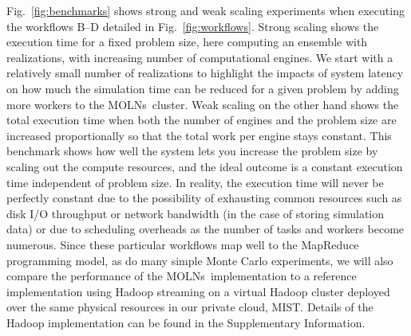 \documentclass[final,leqno,onefignum,onetabnum]{siamltex1213}
\def\packagename {MOLNs}
\begin{document}
Fig.~\ref{fig:benchmarks} shows strong and weak scaling experiments when executing the workflows B--D detailed in Fig.~\ref{fig:workflows}. Strong scaling shows the execution time for a fixed problem size, here computing an ensemble with  realizations, with increasing number of computational engines. We start with a relatively small number of realizations to highlight the impacts of system latency on how much the simulation time can be reduced for a given problem by adding more workers to the \packagename~cluster. Weak scaling on the other hand shows the total execution time when both the number of engines and the problem size are increased proportionally so that the total work per engine stays constant. This benchmark shows how well the system lets you increase the problem size by scaling out the compute resources, and the ideal outcome is a constant execution time independent of problem size. In reality, the execution time will never be perfectly constant due to the possibility of exhausting common resources such as disk I/O throughput or network bandwidth (in the case of storing simulation data) or due to scheduling overheads as the number of tasks and workers become numerous. Since these particular workflows map well to the MapReduce programming model, as do many simple Monte Carlo experiments, we will also compare the performance of the \packagename~implementation to a reference implementation using Hadoop streaming on a virtual Hadoop cluster deployed over the same physical resources in our private cloud, MIST.  Details of the Hadoop implementation can be found in the Supplementary Information. 
\end{document}
